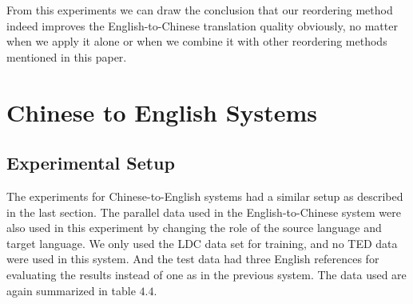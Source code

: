 %

From this experiments we can draw the conclusion that our reordering method indeed improves the English-to-Chinese translation quality obviously, no matter when we apply it alone or when we combine it with other reordering methods mentioned in this paper. %

\section{Chinese to English Systems}
\label{ch:Evaluation:sec:zhen2}


\subsection{Experimental Setup}

The experiments for Chinese-to-English systems had a similar setup as described in the last section. The parallel data used in the English-to-Chinese system were also used in this experiment by changing the role of the source language and target language. We only used the LDC data set for training, and no TED data were used in this system. And the test data had three English references for evaluating the results instead of one as in the previous system. The data used are again summarized in table $4.4$.


